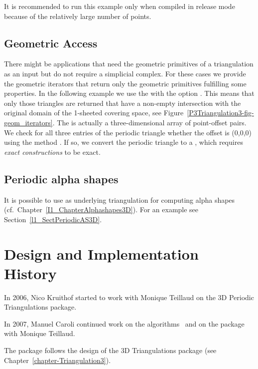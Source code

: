 It is recommended to run this example only when compiled in release
mode because of the relatively large number of points. 


\subsection{Geometric Access}

There might be applications that need the geometric primitives of a
triangulation as an input but do not require a simplicial complex. For
these cases we provide the geometric iterators that return only the
geometric primitives fulfilling some properties. In the following
example we use the  with the option
. This means that only those triangles are
returned that have a non-empty intersection with the original domain
of the 1-sheeted covering space, see
Figure~\ref{P3Triangulation3-fig-geom_iterators}.
The  is actually a three-dimensional array of
point-offset pairs. We check for all three entries of the periodic
triangle whether the offset  is (0,0,0) using the
method . If so, we convert the periodic triangle to a
, which requires \emph{exact constructions} to be
exact.  


\subsection{Periodic alpha shapes}

It is possible to use 
as underlying triangulation for computing alpha shapes (cf.\
Chapter~\ref{I1_ChapterAlphashapes3D}). For an example see
Section~\ref{l1_SectPeriodicAS3D}.

\section{Design and Implementation History}

In 2006, Nico Kruithof started to work with Monique Teillaud on the 3D
Periodic Triangulations package.

In 2007, Manuel Caroli continued work on the
algorithms~\cite{cgal:ct-c3pt-09} and on the package with Monique
Teillaud.

The package follows the design of the 3D Triangulations package
(see Chapter~\ref{chapter-Triangulation3}).
